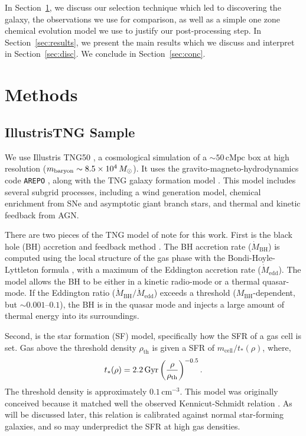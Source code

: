 In Section~\ref{sec:methods}, we discuss our selection technique which led to discovering the galaxy, the observations we use for comparison, as well as a simple one zone chemical evolution model we use to justify our post-processing step. In Section~\ref{sec:results}, we present the main results which we discuss and interpret in Section~\ref{sec:disc}. We conclude in Section~\ref{sec:conc}.

\section{Methods}\label{sec:methods}
\subsection{IllustrisTNG Sample}\label{ssec:tng}
We use Illustris TNG50 \citep{2019MNRAS.490.3196P, 2019MNRAS.490.3234N, 2019ComAC...6....2N}, a cosmological simulation of a $\sim50\,\textrm{cMpc}$ box at high resolution ($m_{\textrm{baryon}}\sim8.5\times10^4\,M_{\odot}$). It uses the gravito-magneto-hydrodynamics code \texttt{AREPO} \citep{2010MNRAS.401..791S, 2016MNRAS.455.1134P}, along with the TNG galaxy formation model \citep{2013MNRAS.436.3031V, 2017MNRAS.465.3291W, 2018MNRAS.473.4077P}. This model includes several subgrid processes, including a wind generation model, chemical enrichment from SNe and asymptotic giant branch stars, and thermal and kinetic feedback from AGN.

There are two pieces of the TNG model of note for this work. First is the black hole (BH) accretion and feedback method \citep{2017MNRAS.465.3291W}. The BH accretion rate ($\dot{M}_{\textrm{BH}}$) is computed using the local structure of the gas phase with the Bondi-Hoyle-Lyttleton formula \citep{1939PCPS...35..405H,1944MNRAS.104..273B,1952MNRAS.112..195B}, with a maximum of the Eddington accretion rate ($\dot{M}_{\textrm{edd}}$). The model allows the BH to be either in a kinetic radio-mode or a thermal quasar-mode. If the Eddington ratio ($\dot{M}_{\textrm{BH}}/\dot{M}_{\textrm{edd}}$) exceeds a threshold ($M_{\textrm{BH}}$-dependent, but $\sim0.001$--$0.1$), the BH is in the quasar mode and injects a large amount of thermal energy into its surroundings.

Second, is the star formation (SF) model, specifically how the SFR of a gas cell is set. Gas above the threshold density $\rho_{\textrm{th}}$ is given a SFR of $m_{\textrm{cell}}/t_{*}(\rho)$, where,
\begin{equation*}
t_{*}(\rho)=2.2\,\textrm{Gyr} \left(\frac{\rho}{\rho_{\textrm{th}}}\right)^{-0.5}\textrm{.}
\end{equation*}
The threshold density is approximately $0.1\,\textrm{cm}^{-3}$. This model was originally conceived because it matched well the observed Kennicut-Schmidt relation \citep{Kennicutt1998,2003MNRAS.339..289S}. As will be discussed later, this relation is calibrated against normal star-forming galaxies, and so may underpredict the SFR at high gas densities.

